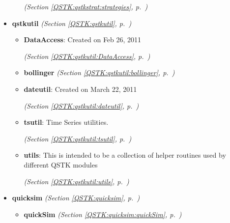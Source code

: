 \begin{itemize}
\begin{itemize}
  \textit{(Section \ref{QSTK:qstkstrat:strategies}, p.~\pageref{QSTK:qstkstrat:strategies})}

  \end{itemize}
\item \textbf{qstkutil}
  \textit{(Section \ref{QSTK:qstkutil}, p.~\pageref{QSTK:qstkutil})}

  \begin{itemize}
\setlength{\parskip}{0ex}
    \item \textbf{DataAccess}: Created on Feb 26, 2011



  \textit{(Section \ref{QSTK:qstkutil:DataAccess}, p.~\pageref{QSTK:qstkutil:DataAccess})}

    \item \textbf{bollinger}
  \textit{(Section \ref{QSTK:qstkutil:bollinger}, p.~\pageref{QSTK:qstkutil:bollinger})}

    \item \textbf{dateutil}: Created on March 22, 2011



  \textit{(Section \ref{QSTK:qstkutil:dateutil}, p.~\pageref{QSTK:qstkutil:dateutil})}

    \item \textbf{tsutil}: Time Series utilities.



  \textit{(Section \ref{QSTK:qstkutil:tsutil}, p.~\pageref{QSTK:qstkutil:tsutil})}

    \item \textbf{utils}: This is intended to be a collection of helper routines used by different 
QSTK modules



  \textit{(Section \ref{QSTK:qstkutil:utils}, p.~\pageref{QSTK:qstkutil:utils})}

  \end{itemize}
\item \textbf{quicksim}
  \textit{(Section \ref{QSTK:quicksim}, p.~\pageref{QSTK:quicksim})}

  \begin{itemize}
\setlength{\parskip}{0ex}
    \item \textbf{quickSim}
  \textit{(Section \ref{QSTK:quicksim:quickSim}, p.~\pageref{QSTK:quicksim:quickSim})}

  \end{itemize}
\end{itemize}



